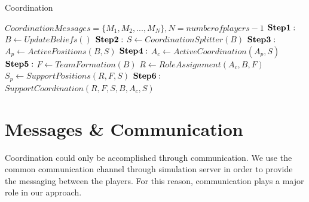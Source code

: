 \begin{algorithm}[htb!]
\caption{Coordination}
\label{Coordination}
\begin{algorithmic}[1]
\STATE $Coordination Messages = \lbrace M_{1},M_{2},...,M_{N} \rbrace , N = number of players-1 $
\STATE ${\bf Step 1}:$ 
\STATE $B \leftarrow Update Beliefs() $
\STATE ${\bf Step 2}:$ 
\STATE $S \leftarrow Coordination Splitter(B) $
\STATE ${\bf Step 3}:$ 
\STATE $A_{p} \leftarrow Active Positions(B,S) $
\STATE ${\bf Step 4}:$ 
\STATE $A_{c} \leftarrow Active Coordination(A_{p},S) $
\STATE ${\bf Step 5}: $
\STATE $ F \leftarrow TeamFormation(B) $
\STATE $ R \leftarrow Role Assignment(A_{c},B,F) $
\STATE $ S_{p} \leftarrow Support Positions(R,F,S) $
\STATE $ {\bf Step 6}:$ 
\STATE $ Support Coordination(R,F,S,B,A_{c},S) $
\end{algorithmic}
\end{algorithm}


\section{Messages \& Communication}
Coordination could only be accomplished through communication. We use the common communication channel through simulation server in order to provide the messaging between the players. For this reason, communication plays a major role in our approach. 

